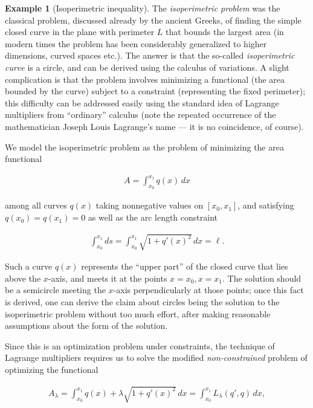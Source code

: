\documentclass[11pt]{report}
\theoremstyle{plain}
\theoremstyle{definition}
\newtheorem{example}[thm]{Example}
\begin{document}
\begin{example}[Isoperimetric inequality]
The \emph{isoperimetric problem} was the classical problem,
discussed already by the ancient Greeks, of finding
the simple closed curve in the plane with perimeter
$L$ that bounds the largest area (in modern times the
problem has been considerably generalized to higher
dimensions, curved spaces etc.). The answer is that
the so-called \emph{isoperimetric curve} is a circle, and
can be derived using the calculus of variations. A
slight complication is that the problem involves
minimizing a functional (the area bounded by the
curve) subject to a constraint (representing the fixed
perimeter); this difficulty can be addressed easily
using the standard idea of Lagrange multipliers from
``ordinary'' calculus (note the repeated occurrence of
the mathematician Joseph Louis Lagrange's name --- it
is no coincidence, of course).

We model the isoperimetric problem as the problem of
minimizing the area functional

\begin{align*}
A = \int_{x_0}^{x_1} q(x)\,dx
\end{align*}

\noindent among all curves $q(x)$ taking nonnegative values on
$[x_0,x_1]$, and satisfying $q(x_0)=q(x_1)=0$ as well
as the arc length constraint

\begin{align*}
\int_{x_0}^{x_1} ds =  \int_{x_0}^{x_1} \sqrt{1+q'(x)^2}\,dx = \ell.
\end{align*}

\noindent Such a curve $q(x)$ represents the ``upper part'' of
the closed curve that lies above the $x$-axis, and
meets it at the points $x=x_0, x=x_1$. The solution
should be a semicircle meeting the $x$-axis
perpendicularly at those points; once this fact is
derived, one can derive the claim about circles being
the solution to the isoperimetric problem without too
much effort, after making reasonable assumptions about
the form of the solution.

Since this is an optimization problem under
constraints, the technique of Lagrange multipliers
requires us to solve the modified \emph{non-constrained}
problem of optimizing the functional

\begin{align*}
A_\lambda = \int_{x_0}^{x_1} q(x) + \lambda \sqrt{1+q'(x)^2}\,dx
= \int_{x_0}^{x_1} L_\lambda(q',q)\,dx,
\end{align*}


\end{example}
\end{document}
